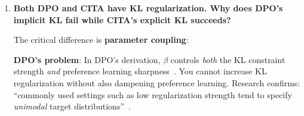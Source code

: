 \begin{enumerate}[label=\textbf{Q\arabic*.}, leftmargin=*, itemsep=8pt]
\textbf{Why it matters}: Instruction-conditioned alignment \textit{requires} multiple behavioral modes:
\begin{itemize}[leftmargin=*,itemsep=1pt]
    \item Mode 1: ``Be concise'' $\rightarrow$ short responses
    \item Mode 2: ``Be detailed'' $\rightarrow$ comprehensive responses
    \item Mode 3: ``Be formal'' $\rightarrow$ professional tone
\end{itemize}

A mode-collapsed model produces similar outputs regardless of instruction---exactly what we observe with DPO (+0.001 instruction sensitivity). CITA's explicit KL prevents this collapse by maintaining proximity to the reference policy's behavioral diversity.

\vspace{4mm}

\item \textbf{Both DPO and CITA have KL regularization. Why does DPO's implicit KL fail while CITA's explicit KL succeeds?}

 The critical difference is \textbf{parameter coupling}:

\begin{table}[ht!]
\centering
\normalsize
\renewcommand{\arraystretch}{1.2}
\caption{DPO implicit vs CITA explicit KL: parameter coupling comparison.}
\label{tab:faq_implicit_vs_explicit_kl}
\end{table}

\textbf{DPO's problem}: In DPO's derivation, $\beta$ controls \textit{both} the KL constraint strength \textit{and} preference learning sharpness~\cite{rafailov2023direct}. You cannot increase KL regularization without also dampening preference learning. Research confirms: ``commonly used settings such as low regularization strength tend to specify \textit{unimodal} target distributions''~\cite{liu2024kl}.


\end{enumerate}

